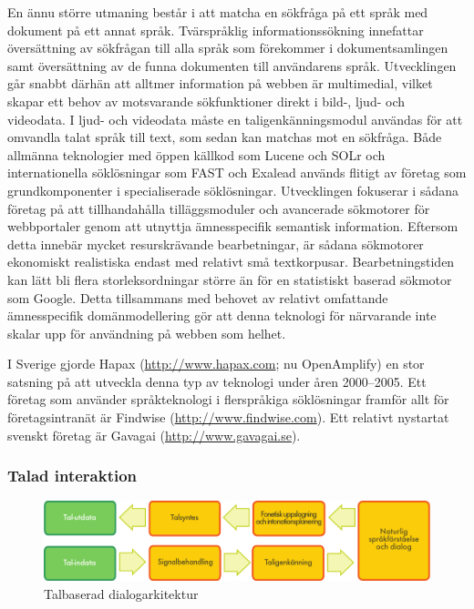 \begin{multicols}{2}
En ännu större utmaning består i att matcha en sökfråga på ett språk
med dokument på ett annat språk. Tvärspråklig informationssökning
innefattar översättning av sökfrågan till alla språk som förekommer i
dokumentsamlingen samt översättning av de funna dokumenten till
användarens språk. Utvecklingen går snabbt därhän att alltmer information på webben är
multimedial, vilket skapar ett behov av motsvarande sökfunktioner
direkt i bild-, ljud- och videodata. I ljud- och videodata måste en
taligenkänningsmodul användas för att omvandla talat språk till text,
som sedan kan matchas mot en sökfråga. Både allmänna teknologier med öppen källkod som Lucene och SOLr och
internationella söklösningar som FAST och Exalead används flitigt av
företag som grundkomponenter i specialiserade sök\-lös\-ning\-ar. Utvecklingen fokuserar i sådana företag på att tillhandahålla
tilläggsmoduler och avancerade sökmotorer för webbportaler genom att
utnyttja ämnesspecifik semantisk information. Eftersom detta innebär
mycket resurskrävande bearbetningar, är sådana sökmotorer ekonomiskt
realistiska endast med relativt små textkorpusar. Bearbetningstiden
kan lätt bli flera storleksordningar större än för en statistiskt
baserad sökmotor som Google. Detta tillsammans med behovet av relativt
omfattande ämnesspecifik domänmodellering gör att denna teknologi för
närvarande inte skalar upp för användning på webben som helhet.

I Sverige gjorde Hapax (\url{http://www.hapax.com}; nu Open\-Amplify) en
stor satsning på att utveckla denna typ av teknologi under åren
2000--2005. Ett företag som använder språkteknologi i fler\-språkiga
sök\-lösningar framför allt för företags\-intra\-nät är Findwise
(\url{http://www.findwise.com}). Ett relativt nystartat svenskt
företag är Gavagai (\url{http://www.gavagai.se}).


\subsubsection{Talad interaktion}

\begin{figure}[htb]
  \center 
  \includegraphics[width=\textwidth]{../_media/swedish/simple_speech-based_dialogue_architecture}
  \caption{Talbaserad dialogarkitektur}
  \label{fig:dialoguearch_sv}
\end{figure}


\end{multicols}
